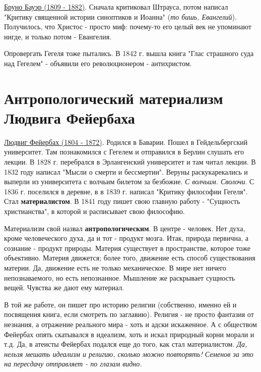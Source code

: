 \underline{Бруно Бауэр (1809 - 1882)}. Сначала критиковал Штрауса, потом написал "Критику священной истории синоптиков и Иоанна" (\textit{то бишь, Евангелий}). Получилось, что Христос - просто миф: почему-то его целый век не упоминают нигде, и только потом - Евангелия.

Опровергать Гегеля тоже пытались. В 1842 г. вышла книга "Глас страшного суда над Гегелем" - объявили его революционером - антихристом.
 
\section{Антропологический материализм Людвига Фейербаха}
\underline{Людвиг Фейербах (1804 - 1872)}. Родился в Баварии. Пошел в Гейдельбергский университет. Там познакомился с Гегелем и отправился в Берлин слушать его лекции. В 1828 г. перебрался в Эрлангенский университет и там читал лекции. В 1832 году написал "Мысли о смерти и бессмертии". Веруны раскукарекались и выперли из университета с волчьим билетом за безбожие. \textit{С волчьим. Сволочи}. С 1836 г. поселился в деревне, в в 1839 г. написал "Критику философии Гегеля". Стал \textbf{материалистом}. В 1841 году пишет свою главную работу - "Сущность христианства", в которой и расписывает свою философию. 

Материализм свой назвал \textbf{антропологическим}. В центре - человек. Нет духа, кроме человеческого духа, да и тот - продукт мозга. Итак, природа первична, а сознание - продукт природы. Материя существует в пространстве, которое тоже объективно. Материя движется; более того, движение есть способ существования материи. Да, движение есть не только механическое. В мире нет ничего непознаваемого, но есть непознанное. Мышление же раскрывает сущность вещей. Чувства же дают ему материал.

В той же работе, он пишет про историю религии (собственно, именно ей и посвящения книга, если смотреть по заглавию). Религия - не просто фантазия от незнания, а отражение реального мира - хоть и адски искаженное. А с обществом Фейербах опять скатывался в идеализм, хоть и искал природный корни морали и т.д. Да, в атеисты Фейербах подался еще до того, как стал материалистом. \textit{Да, нельзя мешать идеализм и религию, сколько можно повторять! Семенов за это на пересдачу отправляет - по глазам видно.} 


